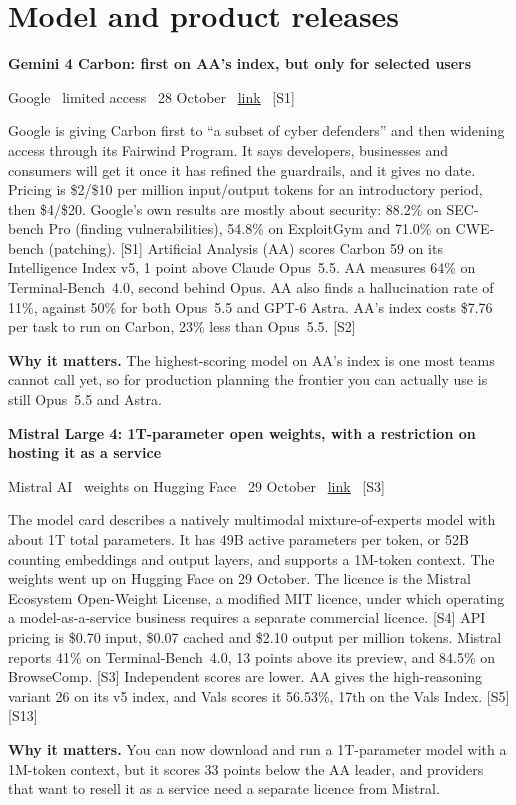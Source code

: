 \documentclass[11pt,a4paper]{article}
\newcommand{\entry}[4]{%
  \par\Needspace{7\baselineskip}\vspace{0.7em}%
  {\sffamily\bfseries\color{brandink}#1}\par
  {\footnotesize\color{brandgrey}#2 \textbullet\ \href{#3}{link} \textbullet\ \srcref{#4}}\par
  \vspace{0.15em}}
\newcommand{\why}[1]{\par{\small\textbf{Why it matters.} #1}\par}
\newcommand{\srcref}[1]{\textcolor{brandaccent}{[S#1]}}
\begin{document}
\section{Model and product releases}

\entry{Gemini 4 Carbon: first on AA's index, but only for selected users}{Google \textbullet\ limited access \textbullet\ 28 October}{https://blog.google/innovation-and-ai/models-and-research/gemini-models/introducing-gemini-4-carbon/}{1}
Google is giving Carbon first to ``a subset of cyber defenders'' and then widening access through its Fairwind Program. It says
developers, businesses and consumers will get it once it has refined the guardrails, and it gives no date. Pricing is \$2/\$10 per million input/output tokens for an introductory period, then \$4/\$20.
Google's own results are mostly about security: 88.2\% on SEC-bench Pro (finding vulnerabilities), 54.8\% on ExploitGym and 71.0\% on CWE-bench (patching). \srcref{1}
Artificial Analysis (AA) scores Carbon 59 on its Intelligence Index v5, 1 point above Claude Opus~5.5. AA measures 64\% on Terminal-Bench~4.0, second behind Opus. AA also finds a hallucination rate of 11\%, against 50\% for both Opus~5.5 and GPT-6 Astra.
AA's index costs \$7.76 per task to run on Carbon, 23\% less than Opus~5.5. \srcref{2}
\why{The highest-scoring model on AA's index is one most teams cannot call yet, so for production planning the frontier you can actually use is still Opus~5.5 and Astra.}

\entry{Mistral Large 4: 1T-parameter open weights, with a restriction on hosting it as a service}{Mistral AI \textbullet\ weights on Hugging Face \textbullet\ 29 October}{https://mistral.ai/news/mistral-large-4-oss/}{3}
The model card describes a natively multimodal mixture-of-experts model with about 1T total parameters. It has 49B active parameters per token, or 52B counting embeddings and output layers, and supports a 1M-token context.
The weights went up on Hugging Face on 29 October. The licence is the Mistral Ecosystem Open-Weight License, a modified MIT licence, under which operating a model-as-a-service business requires a separate commercial licence. \srcref{4}
API pricing is \$0.70 input, \$0.07 cached and \$2.10 output per million tokens. Mistral reports 41\% on Terminal-Bench~4.0, 13 points above its preview, and 84.5\% on BrowseComp. \srcref{3}
Independent scores are lower. AA gives the high-reasoning variant 26 on its v5 index, and Vals scores it 56.53\%, 17th on the Vals Index. \srcref{5}\,\srcref{13}
\why{You can now download and run a 1T-parameter model with a 1M-token context, but it scores 33 points below the AA leader, and providers that want to resell it as a service need a separate licence from Mistral.}
\end{document}
